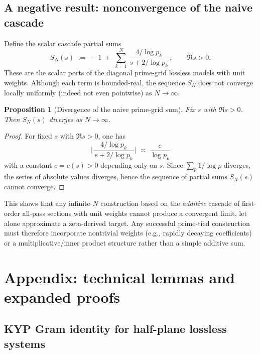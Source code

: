 \documentclass[11pt]{article}
\newtheorem{proposition}[theorem]{Proposition}
\theoremstyle{remark}
\begin{document}
\subsection*{A negative result: nonconvergence of the naive cascade}
Define the scalar cascade partial sums
\[
 S_N(s)\;:=\;-1\; +\;\sum_{k=1}^{N} \frac{4/\log p_k}{\,s+2/\log p_k\,},\qquad \Re s>0.
\]
These are the scalar ports of the diagonal prime-grid lossless models with unit weights. Although each term is bounded-real, the sequence \(S_N\) does not converge locally uniformly (indeed not even pointwise) as \(N\to\infty\).

\begin{proposition}[Divergence of the naive prime-grid sum]\label{prop:divergence}
Fix \(s\) with \(\Re s>0\). Then \(S_N(s)\) diverges as \(N\to\infty\).
\end{proposition}
\begin{proof}
For fixed \(s\) with \(\Re s>0\), one has
\[
 \Big|\frac{4/\log p_k}{\,s+2/\log p_k\,}\Big|\;\asymp\; \frac{c}{\log p_k}
\]
with a constant \(c=c(s)>0\) depending only on \(s\). Since \(\sum_{p}\!1/\log p\) diverges, the series of absolute values diverges, hence the sequence of partial sums \(S_N(s)\) cannot converge.
\end{proof}
\noindent This shows that any infinite-$N$ construction based on the \emph{additive} cascade of first-order all-pass sections with unit weights cannot produce a convergent limit, let alone approximate a zeta-derived target. Any successful prime-tied construction must therefore incorporate nontrivial weights (e.g., rapidly decaying coefficients) or a multiplicative/inner product structure rather than a simple additive sum.
\appendix
\section{Appendix: technical lemmas and expanded proofs}\label{sec:appendix}

\subsection{KYP Gram identity for half-plane lossless systems}\label{app:KYP-gram-appendix}
\end{document}
